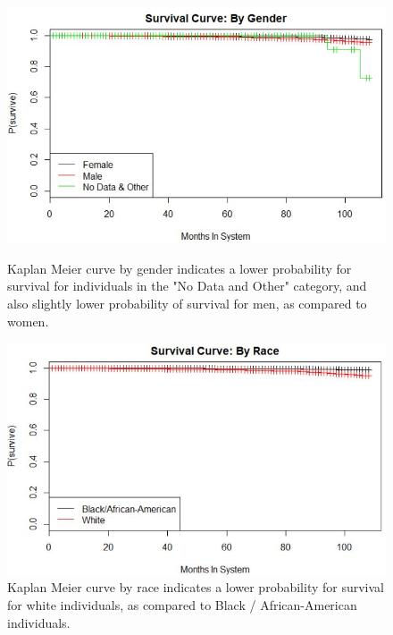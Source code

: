 \documentclass[twoside,10.5pt]{article}
\begin{document}
\begin{figure}[h!]
\centering
\begin{minipage}{.5\textwidth}
  \centering
  \includegraphics[width=1\linewidth]{images/kaplan_meier_gender.JPG}
  \caption{Kaplan Meier curve by gender indicates a lower probability for survival for individuals in the "No Data and Other" category, and also slightly lower probability of survival for men, as compared to women.}
  \label{fig:km_gender}
\end{minipage}%
\begin{minipage}{.5\textwidth}
  \centering
  \includegraphics[width=1\linewidth]{images/kaplan_meier_race.JPG}
  \caption{Kaplan Meier curve by race indicates a lower probability for survival for white individuals, as compared to Black / African-American individuals.}
  \label{fig:km_race}
\end{minipage}
\end{figure}
\end{document}
